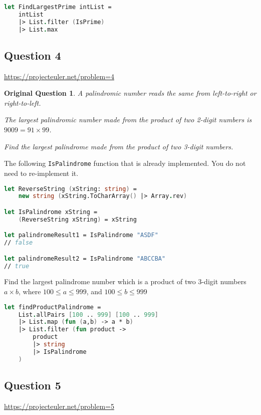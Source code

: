 \documentclass[12pt]{article}
\newtheorem*{origQuestion*}{Original Question}
\begin{document}
\begin{lstlisting}[language=FSharp]
let FindLargestPrime intList =
    intList
    |> List.filter (IsPrime)
    |> List.max
\end{lstlisting}

\pagebreak
\subsection*{Question 4} 
\url{https://projecteuler.net/problem=4}
\begin{origQuestion*}
A palindromic number reads the same from left-to-right or right-to-left. 

The largest palindromic number made from the product of two 2-digit numbers is $9009 = 91 \times 99$.

Find the largest palindrome made from the product of two 3-digit numbers.
\end{origQuestion*}

The following \texttt{IsPalindrome} function that is already implemented. You do not need to re-implement it.
\begin{lstlisting}[language=FSharp]
let ReverseString (xString: string) =
    new string (xString.ToCharArray() |> Array.rev)

let IsPalindrome xString =
    (ReverseString xString) = xString

let palindromeResult1 = IsPalindrome "ASDF"   
// false

let palindromeResult2 = IsPalindrome "ABCCBA" 
// true
\end{lstlisting}
Find the largest palindrome number which is a product of two 3-digit numbers $a \times b$, where $100 \leq a \leq 999$, and $100 \leq b \leq 999$
\begin{lstlisting}[language=FSharp]
let findProductPalindrome =
    List.allPairs [100 .. 999] [100 .. 999]
    |> List.map (fun (a,b) -> a * b)
    |> List.filter (fun product ->
        product
        |> string
        |> IsPalindrome
    )
\end{lstlisting}
\pagebreak
\subsection*{Question 5} 
\url{https://projecteuler.net/problem=5}
\end{document}
